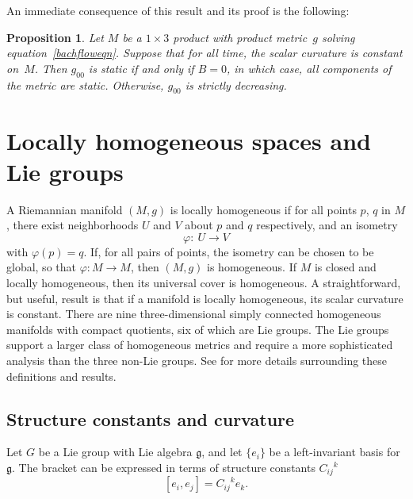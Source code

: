 \documentclass[10pt,a4paper]{amsart}
\numberwithin{equation}{section}
\newtheorem{Proposition}[Theorem]{Proposition}
 { \theoremstyle{definition}
\newtheorem{Definition}[Theorem]{Definition}
\newtheorem{Example}[Theorem]{Example}
\newtheorem{Remark}[Theorem]{Remark} }
\begin{document}
An immediate consequence of this result and its proof is the following:

\begin{Proposition} \label{g00monotonicprop}
Let $M$ be a $1 \times 3$ product with product metric~$g$ solving equation~\eqref{bachfloweqn}. Suppose that for all time, the scalar curvature is constant on~$M$. Then $g_{00}$ is static if and only if $B = 0$, in which case, all components of the metric are static. Otherwise, $g_{00}$ is strictly decreasing.
\end{Proposition}

\section{Locally homogeneous spaces and Lie groups} \label{spacebackgroundsec}

A Riemannian manifold $(M, g)$ is locally homogeneous if for all points $p$, $q$ in $M$, there exist neighborhoods $U$ and $V$ about $p$ and $q$ respectively, and an isometry
\[
\varphi\colon \ U \rightarrow V
\]
with $\varphi(p) = q$. If, for all pairs of points, the isometry can be chosen to be global, so that $\varphi\colon M \rightarrow M$, then $(M, g)$ is homogeneous. If $M$ is closed and locally homogeneous, then its universal cover is homogeneous. A straightforward, but useful, result is that if a manifold is locally homogeneous, its scalar curvature is constant. There are nine three-dimensional simply connected homogeneous manifolds with compact quotients, six of which are Lie groups. The Lie groups support a larger class of homogeneous metrics and require a more sophisticated analysis than the three non-Lie groups. See \cite{IJ} for more details surrounding these definitions and results.

\subsection{Structure constants and curvature}

Let $G$ be a Lie group with Lie algebra $\mathfrak{g}$, and let $\{e_i\}$ be a left-invariant basis for $\mathfrak{g}$. The bracket can be expressed in terms of structure constants ${C_{ij}}^k$
\[
[e_i, e_j] = {C_{ij}}^k e_k.
\]
\end{document}
